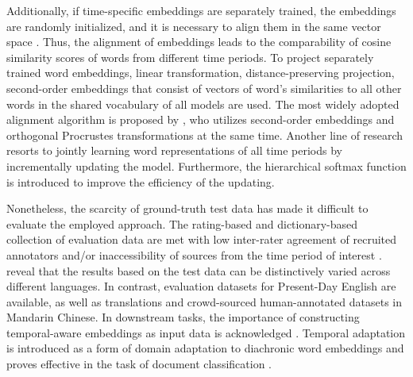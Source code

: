 Additionally, if time-specific embeddings are separately trained, the embeddings are randomly initialized, and it is necessary to align them in the same vector space \parencite{hamilton2016law}. Thus, the alignment of embeddings leads to the comparability of cosine similarity scores of words from different time periods. To project separately trained word embeddings, linear transformation, distance-preserving projection, second-order embeddings that consist of vectors of word's similarities to all other words in the shared vocabulary of all models are used. The most widely adopted alignment algorithm is proposed by \textcite{hamilton2016law}, who utilizes second-order embeddings and orthogonal Procrustes transformations at the same time. Another line of research resorts to jointly learning word representations of all time periods by incrementally updating the model. Furthermore, the hierarchical softmax function is introduced to improve the efficiency of the updating.

Nonetheless, the scarcity of ground-truth test data has made it difficult to evaluate the employed approach. The rating-based and dictionary-based collection of evaluation data are met with low inter-rater agreement of recruited annotators and/or inaccessibility of sources from the time period of interest \parencite{tang2018state}. \textcite{kutuzov2020uio} reveal that the results based on the test data can be distinctively varied across different languages. In contrast, evaluation datasets for Present-Day English are available, as well as translations and crowd-sourced human-annotated datasets in Mandarin Chinese. In downstream tasks, the importance of constructing temporal-aware embeddings as input data is acknowledged \parencite{huang2019neural}. Temporal adaptation is introduced as a form of domain adaptation to diachronic word embeddings and proves effective in the task of document classification \parencite{huang2019neural}.%

